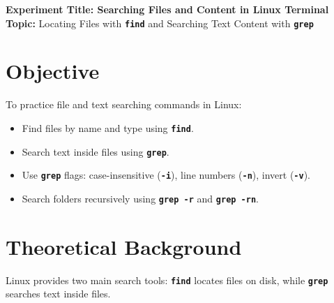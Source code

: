\documentclass[10pt,a4paper]{article}
\newcommand{\cmd}[1]{\texttt{\textbf{#1}}}
\begin{document}
\raggedbottom
\thispagestyle{firstpage}

\begin{center}
  {\Large\bfseries\sffamily\color{primary} Experiment Title: Searching Files and Content in Linux Terminal}\\[3pt]
  {\normalsize\sffamily\textbf{Topic:} Locating Files with \cmd{find} and Searching Text Content with \cmd{grep}}
\end{center}
\vspace{-4pt}

\section{Objective}
To practice file and text searching commands in Linux:
\begin{itemize}[noitemsep,topsep=1pt,leftmargin=1.2em]
  \item Find files by name and type using \cmd{find}.
  \item Search text inside files using \cmd{grep}.
  \item Use \cmd{grep} flags: case-insensitive (\cmd{-i}), line numbers (\cmd{-n}), invert (\cmd{-v}).
  \item Search folders recursively using \cmd{grep -r} and \cmd{grep -rn}.
\end{itemize}

\section{Theoretical Background}
Linux provides two main search tools: \cmd{find} locates files on disk, while \cmd{grep} searches text inside files.
\end{document}
